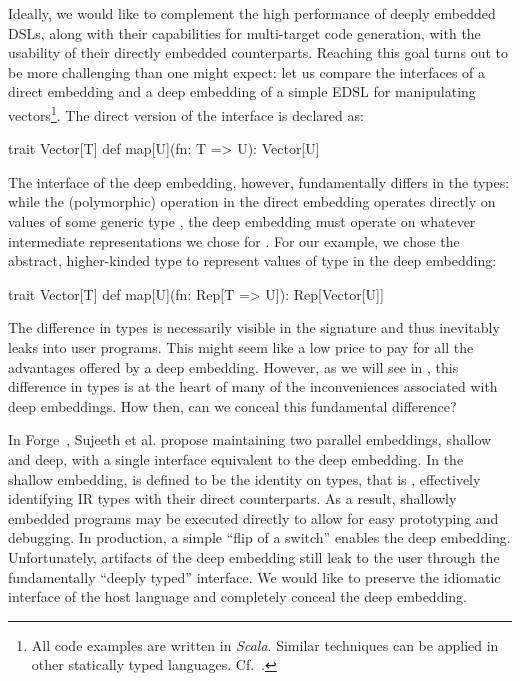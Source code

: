 Ideally, we would like to complement the high performance of deeply
embedded DSLs, along with their capabilities for multi-target code
generation, with the usability of their directly embedded counterparts.
Reaching this goal turns out to
be more challenging than one might expect: let us compare the
interfaces of a direct embedding and a deep embedding of a simple
EDSL for manipulating vectors\footnote{
  All code examples are written in \emph{Scala}.  Similar techniques can
  be applied in other statically typed languages.  Cf.~\cite{carette_finally_2009,awesome,svenningsson_combining_2012}.}.
The direct version of the interface is declared as: \vspace{3pt}
\begin{listingtiny}
trait Vector[T] {
  def map[U](fn: T => U): Vector[U]
}
\end{listingtiny}
\vspace{3pt} The interface of the deep embedding, however,
fundamentally differs in the types: while the (polymorphic) 
operation in the direct embedding operates directly on values of some
generic type , the deep embedding must operate on whatever
intermediate representations we chose for . For our example,
we chose the abstract, higher-kinded type  to represent
values of type  in the deep embedding: \vspace{3pt}
\begin{listingtiny}
trait Vector[T] {
  def map[U](fn: Rep[T => U]): Rep[Vector[U]]
}
\end{listingtiny}

\vspace{3pt} The difference in types is necessarily visible in the
signature and thus inevitably leaks into user programs.  This might seem like
a low price to pay for all the advantages offered by a deep embedding.
However, as we will see in , this
difference in types is at the heart of many of the inconveniences
associated with deep embeddings. How then, can we conceal
this fundamental difference?

In Forge~\cite{forge}, Sujeeth et al. propose maintaining two parallel
embeddings, shallow and deep, with a single interface equivalent to
the deep embedding.  In the shallow embedding,  is defined
to be the identity on types, that is , effectively
identifying IR types with their direct counterparts.  As a result,
shallowly embedded programs may be executed directly to allow for easy
prototyping and debugging.  In production, a simple ``flip of a switch''
enables the deep embedding.  Unfortunately, artifacts of the deep
embedding still leak to the user through the fundamentally ``deeply
typed'' interface. We would like to preserve the idiomatic interface
of the host language and completely conceal the deep embedding.

